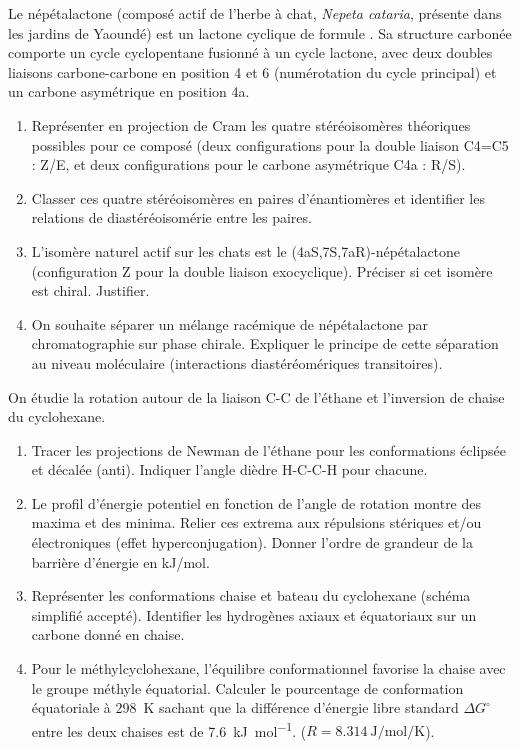 \documentclass[11pt]{article}
\begin{document}
\begin{exercice}
Le népétalactone (composé actif de l'herbe à chat, \emph{Nepeta cataria}, présente dans les jardins de Yaoundé) est un lactone cyclique de formule . Sa structure carbonée comporte un cycle cyclopentane fusionné à un cycle lactone, avec deux doubles liaisons carbone-carbone en position 4 et 6 (numérotation du cycle principal) et un carbone asymétrique en position 4a.
\begin{enumerate}
    \item Représenter en projection de Cram les quatre stéréoisomères théoriques possibles pour ce composé (deux configurations pour la double liaison C4=C5 : Z/E, et deux configurations pour le carbone asymétrique C4a : R/S).
    \item Classer ces quatre stéréoisomères en paires d'énantiomères et identifier les relations de diastéréoisomérie entre les paires.
    \item L'isomère naturel actif sur les chats est le (4aS,7S,7aR)-népétalactone (configuration Z pour la double liaison exocyclique). Préciser si cet isomère est chiral. Justifier.
    \item On souhaite séparer un mélange racémique de népétalactone par chromatographie sur phase chirale. Expliquer le principe de cette séparation au niveau moléculaire (interactions diastéréomériques transitoires).
\end{enumerate}
\end{exercice}

\begin{exercice}
On étudie la rotation autour de la liaison C-C de l'éthane et l'inversion de chaise du cyclohexane.
\begin{enumerate}
    \item Tracer les projections de Newman de l'éthane pour les conformations éclipsée et décalée (anti). Indiquer l'angle dièdre H-C-C-H pour chacune.
    \item Le profil d'énergie potentiel en fonction de l'angle de rotation montre des maxima et des minima. Relier ces extrema aux répulsions stériques et/ou électroniques (effet hyperconjugation). Donner l'ordre de grandeur de la barrière d'énergie en kJ/mol.
    \item Représenter les conformations chaise et bateau du cyclohexane (schéma simplifié accepté). Identifier les hydrogènes axiaux et équatoriaux sur un carbone donné en chaise.
    \item Pour le méthylcyclohexane, l'équilibre conformationnel favorise la chaise avec le groupe méthyle équatorial. Calculer le pourcentage de conformation équatoriale à \SI{298}{\kelvin} sachant que la différence d'énergie libre standard $\Delta G^\circ$ entre les deux chaises est de \SI{7.6}{\kilo\joule\per\mole}. ($R = \SI{8.314}{\joule\per\mole\per\kelvin}$).
\end{enumerate}
\end{exercice}
\end{document}
